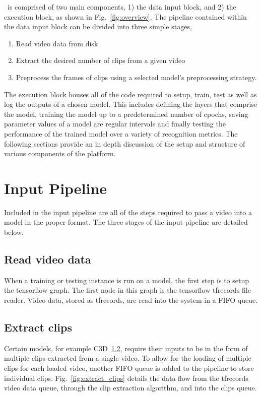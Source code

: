 \documentclass{llncs}
\begin{document}
\acro~is comprised of two main components, 1) the data input block, and 2) the execution block, as shown in Fig.~\ref{fig:overview}. 
The pipeline contained within the data input block can be divided into three simple stages,
\begin{enumerate}
\item Read video data from disk
\item Extract the desired number of clips from a given video
\item Preprocess the frames of clips using a selected model's preprocessing strategy.
\end{enumerate}
The execution block houses all of the code required to setup, train, test as well as log the outputs of a chosen model.
This includes defining the layers that comprise the model, training the model up to a predetermined number of epochs, saving parameter values of a model are regular intervals and finally testing the performance of the trained model over a variety of recognition metrics.
The following sections provide an in depth discussion of the setup and structure of various components of the platform.

\section{Input Pipeline}
\label{sec:ippipeline}
Included in the input pipeline are all of the steps required to pass a video into a model in the proper format.
The three stages of the input pipeline are detailed below.

\subsection{Read video data}
When a training or testing instance is run on a model, the first step is to setup the tensorflow graph.
The first node in this graph is the tensorflow tfrecords file reader. 
Video data, stored as tfrecords, are read into the system in a FIFO queue.


\subsection{Extract clips}
Certain models, for example C3D~\ref{}, require their inputs to be in the form of multiple clips extracted from a single video.
To allow for the loading of multiple clips for each loaded video, another FIFO queue is added to the pipeline to store individual clips.
Fig.~\ref{fig:extract_clips} details the data flow from the tfrecords video data queue, through the clip extraction algorithm, and into the clips queue.
\end{document}
